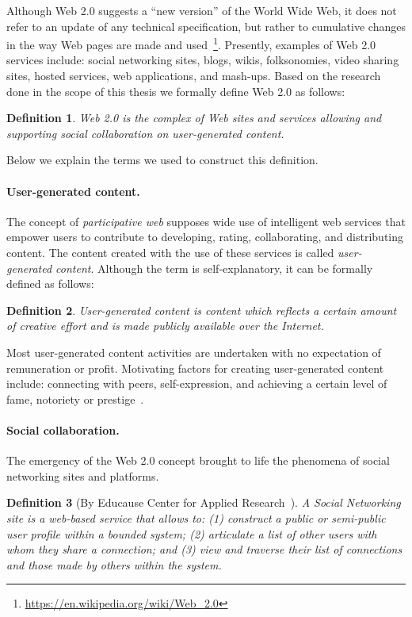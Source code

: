 \documentclass[PhD, Submit, ngerman,UKenglish,table]{scrbook}
\newtheorem{definition}{Definition}
\begin{document}
Although Web 2.0 suggests a ``new version'' of the World Wide Web, it does not refer to an update of any technical specification, but rather to cumulative changes in the way Web pages are made and used~\footnote{\url{https://en.wikipedia.org/wiki/Web_2.0}}.
Presently, examples of Web 2.0 services include: social networking sites, blogs, wikis, folksonomies, video sharing sites, hosted services, web applications, and mash-ups.
Based on the research done in the scope of this thesis we formally define Web 2.0 as follows:
\begin{definition}
Web 2.0 is the complex of Web sites and services allowing and supporting social collaboration on user-generated content.
\end{definition}

Below we explain the terms we used to construct this definition.

\paragraph{User-generated content.} 
The concept of \emph{participative web} supposes wide use of intelligent web services that empower users to contribute to developing, rating, collaborating, and distributing content.
The content created with the use of these services is called \emph{user-generated content}. 
Although the term is self-explanatory, it can be formally defined as follows:
\begin{definition}User-generated content is content which reflects a certain amount of creative effort and is made publicly available over the Internet.
\end{definition}

Most user-generated content activities are undertaken with no expectation of
remuneration or profit.
Motivating factors for creating user-generated content include: connecting with peers, self-expression, and achieving a certain level of fame, notoriety or prestige~\cite{Vickery:2007:PWU:1554640}.
 
\paragraph{Social collaboration.}
The emergency of the Web 2.0 concept brought to life the phenomena of social networking sites and platforms.

\begin{definition}[By Educause Center for Applied Research~\cite{educause}]
A Social Networking site is a web-based service that allows to: (1) construct a public or semi-public user profile within a bounded system; (2) articulate a list of other users with whom they share a connection; and (3) view and traverse their list of connections and those made by others within the system.
\end{definition}
\end{document}
